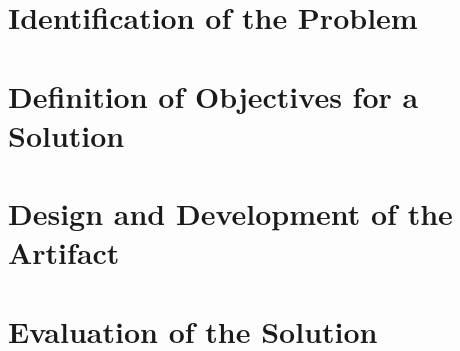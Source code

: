\begin{appendices}



\section{Identification of the Problem}\label{appendix:A}

\newpage

\section{Definition of Objectives for a Solution}\label{appendix:B}

\newpage

\section{Design and Development of the Artifact}\label{appendix:C}

\newpage

\section{Evaluation of the Solution}\label{appendix:D}





\end{appendices}

